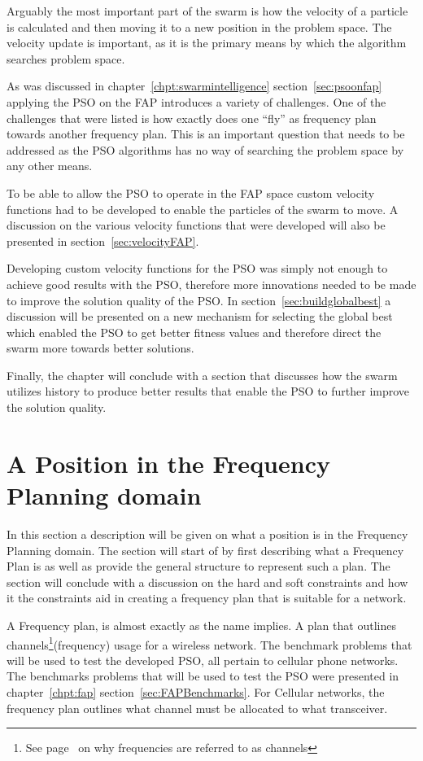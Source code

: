 Arguably the most important part of the swarm is how the velocity of a particle is calculated and then moving it to a new position in the problem space. The velocity update is important, as it is the primary means by which the algorithm searches problem space.

As was discussed in chapter~\ref{chpt:swarmintelligence} section~\ref{sec:psoonfap} applying the PSO on the FAP introduces a variety of challenges. One of the challenges that were listed is how exactly does one ``fly'' as frequency plan towards another frequency plan. This is an important question that needs to be addressed as the PSO algorithms has no way of searching the problem space by any other means.

To be able to allow the PSO to operate in the FAP space custom velocity functions had to be developed to enable the particles of the swarm to move. A discussion on the various velocity functions that were developed will also be presented in section~\ref{sec:velocityFAP}. 

Developing custom velocity functions for the PSO was simply not enough to achieve good results with the PSO, therefore more innovations needed to be made to improve the solution quality of the PSO. In section~\ref{sec:buildglobalbest} a discussion will be presented on a new mechanism for selecting the global best which enabled the PSO to get better fitness values and therefore direct the swarm more towards better solutions. 

Finally, the chapter will conclude with a section that discusses how the swarm utilizes history to produce better results that enable the PSO to further improve the solution quality.
\section{A Position in the Frequency Planning domain}
In this section a description will be given on what a position is in the Frequency Planning domain. The section will start of by first describing what a Frequency Plan is as well as provide the general structure to represent such a plan. The section will conclude with a discussion on the hard and soft constraints and how it the constraints aid in creating a frequency plan that is suitable for a network.

A Frequency plan, is almost exactly as the name implies. A plan that outlines channels\footnote{See page~\pageref{def:channel} on why frequencies are referred to as channels}(frequency) usage for a wireless network. The benchmark problems that will be used to test the developed PSO, all pertain to cellular phone networks. The benchmarks problems that will be used to test the PSO were presented in chapter~\ref{chpt:fap} section~\ref{sec:FAPBenchmarks}. For Cellular networks, the frequency plan outlines what channel must be allocated to what transceiver.

